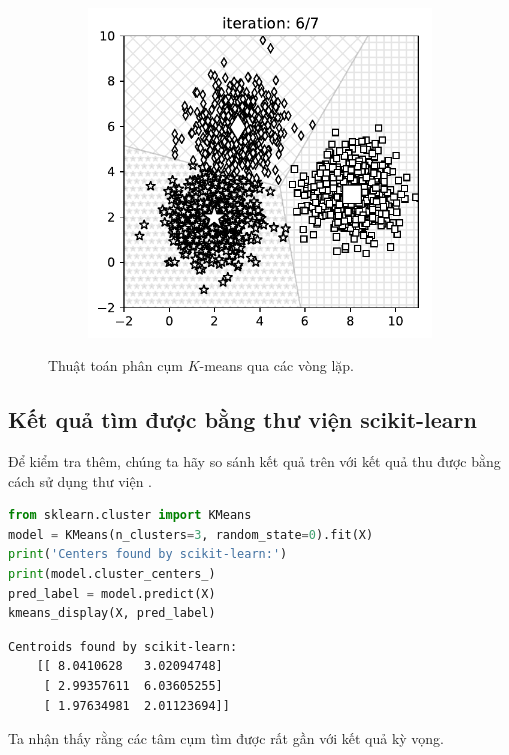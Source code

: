 \begin{figure}[t]
\begin{subfigure}{0.325\textwidth}
    \end{subfigure}
    \begin{subfigure}{0.325\textwidth}
    \includegraphics[width=0.99\linewidth]{ebookML_src/src/kmeans/ex_5.pdf}
    \end{subfigure}
    \caption{
        Thuật toán phân cụm $K$-means qua các vòng lặp.     
    }
    \label{fig:4_example}
\end{figure}




\subsection{Kết quả tìm được bằng thư viện scikit-learn}

Để kiểm tra thêm, chúng ta hãy so sánh kết quả trên với kết quả thu được bằng
cách sử dụng thư viện
\href{http://scikit-learn.org/stable/modules/generated/sklearn.cluster.KMeans.html}{}.

\begin{lstlisting}[language=Python]
from sklearn.cluster import KMeans
model = KMeans(n_clusters=3, random_state=0).fit(X)
print('Centers found by scikit-learn:')
print(model.cluster_centers_)
pred_label = model.predict(X)
kmeans_display(X, pred_label)
\end{lstlisting}
\kq 
\begin{lstlisting}
Centroids found by scikit-learn:
    [[ 8.0410628   3.02094748]
     [ 2.99357611  6.03605255]
     [ 1.97634981  2.01123694]]
\end{lstlisting}
Ta nhận thấy rằng các tâm cụm tìm được rất gần với kết quả kỳ vọng. 

